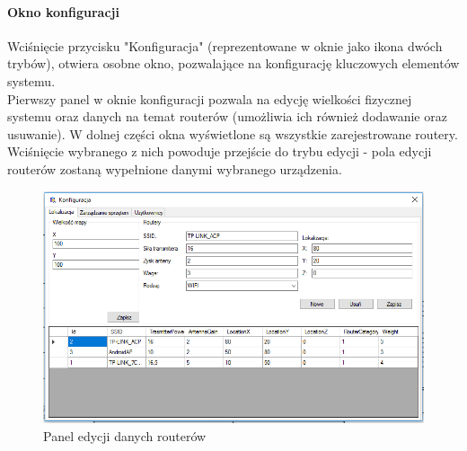 \documentclass{article}
\begin{document}
		\paragraph{Okno konfiguracji}
		Wciśnięcie przycisku "Konfiguracja" (reprezentowane w oknie jako ikona dwóch trybów), otwiera osobne okno, pozwalające na konfigurację kluczowych elementów systemu.\\
		Pierwszy panel w oknie konfiguracji pozwala na edycję wielkości fizycznej systemu oraz danych na temat routerów (umożliwia ich również dodawanie oraz usuwanie).
		W dolnej części okna wyświetlone są wszystkie zarejestrowane routery. Wciśnięcie wybranego z nich powoduje przejście do trybu edycji - pola edycji routerów zostaną wypełnione danymi wybranego urządzenia.
		\begin{figure}[H]			
			\centering
			\caption{Panel edycji danych routerów}
			\includegraphics[width=1.0\textwidth]{panel_konf_router}
		\end{figure} 
		
\end{document}

